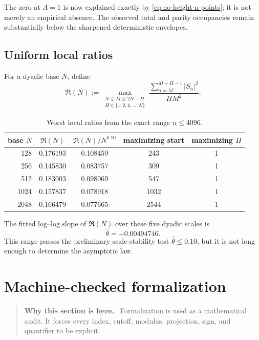 \documentclass[11pt]{article}
\theoremstyle{definition}
\theoremstyle{remark}
\newcommand{\1}{\mathbf{1}}
\newenvironment{motivation}
  {\begin{quote}\small\color{ovvogray}\textbf{Why this section is here.}\ }
  {\end{quote}}
\begin{document}
The zero at $\Lambda=1$ is now explained exactly by
\cref{eq:no-height-n-points}; it is not merely an empirical absence.
The observed total and parity occupancies remain substantially below
the sharpened deterministic envelopes.

\subsection{Uniform local ratios}

For a dyadic base $N$, define
\begin{equation}
 \mathfrak R(N)
 :=
 \max_{\substack{
 N\le M\le2N-H\\
 H\in\{1,2,4,\ldots,N\}
 }}
 \frac{\sum_{n=M}^{M+H-1}|S_n|^2}{HM^2}.
 \label{eq:worst-local-ratio}
\end{equation}

\begin{table}[htbp]
\centering
\caption{Worst local ratios from the exact range $n\le4096$.}
\label{tab:local-ratios}
\small
\begin{tabular}{rcccc}
\toprule
base $N$ &
$\mathfrak R(N)$ &
$\mathfrak R(N)/N^{0.10}$ &
maximizing start &
maximizing $H$\\
\midrule
128  & 0.176193 & 0.108459 & 243  & 1\\
256  & 0.145830 & 0.083757 & 309  & 1\\
512  & 0.183003 & 0.098069 & 547  & 1\\
1024 & 0.157837 & 0.078918 & 1032 & 1\\
2048 & 0.166479 & 0.077665 & 2544 & 1\\
\bottomrule
\end{tabular}
\end{table}

The fitted log--log slope of $\mathfrak R(N)$ over these five dyadic
scales is
\begin{equation}
 \widehat\theta=-0.00494746.
 \label{eq:local-slope}
\end{equation}
This range passes the preliminary scale-stability test
$\widehat\theta\le0.10$, but it is not long enough to determine the
asymptotic law.

\section{Machine-checked formalization}
\label{sec:lean}

\begin{motivation}
Formalization is used as a mathematical audit.  It forces every index, cutoff, modulus, projection, sign, and quantifier to be explicit.
\end{motivation}
\end{document}

